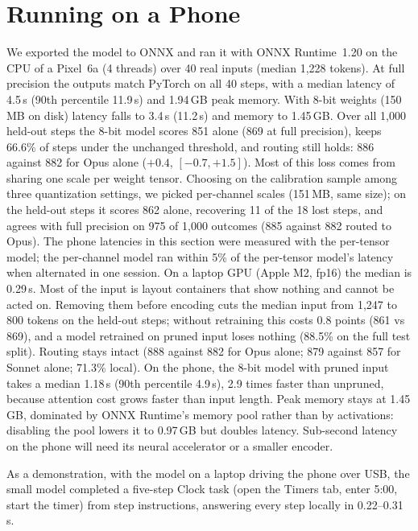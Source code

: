 \documentclass[10pt]{article}
\begin{document}
\section{Running on a Phone}\label{sec:device}
We exported the model to ONNX and ran it with ONNX Runtime~1.20 on the CPU of a Pixel~6a (4 threads) over 40 real inputs (median 1{,}228 tokens). At full precision the outputs match PyTorch on all 40 steps, with a median latency of 4.5\,s (90th percentile 11.9\,s) and 1.94\,GB peak memory. With 8-bit weights (150\,MB on disk) latency falls to 3.4\,s (11.2\,s) and memory to 1.45\,GB. Over all 1{,}000 held-out steps the 8-bit model scores 851 alone (869 at full precision), keeps 66.6\% of steps under the unchanged threshold, and routing still holds: 886 against 882 for Opus alone ($+0.4$, $[-0.7, +1.5]$). Most of this loss comes from sharing one scale per weight tensor. Choosing on the calibration sample among three quantization settings, we picked per-channel scales (151\,MB, same size); on the held-out steps it scores 862 alone, recovering 11 of the 18 lost steps, and agrees with full precision on 975 of 1{,}000 outcomes (885 against 882 routed to Opus). The phone latencies in this section were measured with the per-tensor model; the per-channel model ran within 5\% of the per-tensor model's latency when alternated in one session. On a laptop GPU (Apple M2, fp16) the median is 0.29\,s. Most of the input is layout containers that show nothing and cannot be acted on. Removing them before encoding cuts the median input from 1{,}247 to 800 tokens on the held-out steps; without retraining this costs 0.8 points (861 vs 869), and a model retrained on pruned input loses nothing (88.5\% on the full test split). Routing stays intact (888 against 882 for Opus alone; 879 against 857 for Sonnet alone; 71.3\% local). On the phone, the 8-bit model with pruned input takes a median 1.18\,s (90th percentile 4.9\,s), 2.9 times faster than unpruned, because attention cost grows faster than input length. Peak memory stays at 1.45\,GB, dominated by ONNX Runtime's memory pool rather than by activations: disabling the pool lowers it to 0.97\,GB but doubles latency. Sub-second latency on the phone will need its neural accelerator or a smaller encoder.

As a demonstration, with the model on a laptop driving the phone over USB, the small model completed a five-step Clock task (open the Timers tab, enter 5:00, start the timer) from step instructions, answering every step locally in 0.22--0.31\,s.
\end{document}
